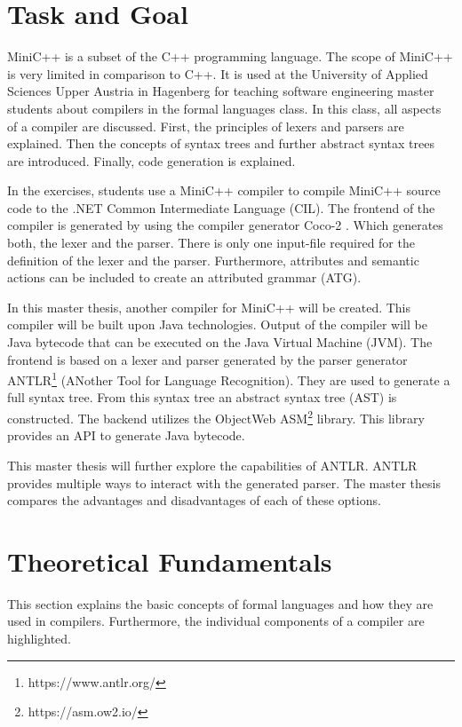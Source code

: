 \section{Task and Goal}

MiniC++ is a subset of the C++ programming language. The scope of MiniC++ is very limited in comparison to C++. It is used at the University of Applied Sciences Upper Austria in Hagenberg for teaching software engineering master students about compilers in the formal languages class. In this class, all aspects of a compiler are discussed. First, the principles of lexers and parsers are explained. Then the concepts of syntax trees and further abstract syntax trees are introduced. Finally, code generation is explained. 

In the exercises, students use a MiniC++ compiler to compile MiniC++ source code to the .NET Common Intermediate Language (CIL). The frontend of the compiler is generated by using the compiler generator Coco-2 \parencite{doblerCoco2}. Which generates both, the lexer and the parser. There is only one input-file required for the definition of the lexer and the parser. Furthermore, attributes and semantic actions can be included to create an attributed grammar (ATG). 

In this master thesis, another compiler for MiniC++ will be created. This compiler will be built upon Java technologies. Output of the compiler will be Java bytecode that can be executed on the Java Virtual Machine (JVM). The frontend is based on a lexer and parser generated by the parser generator ANTLR\footnote{https://www.antlr.org/} (ANother Tool for Language Recognition). They are used to generate a full syntax tree. From this syntax tree an abstract syntax tree (AST) is constructed. The backend utilizes the ObjectWeb ASM\footnote{https://asm.ow2.io/} library. This library provides an API to generate Java bytecode. 

This master thesis will further explore the capabilities of ANTLR. ANTLR provides multiple ways to interact with the generated parser. The master thesis compares the advantages and disadvantages of each of these options.

\section{Theoretical Fundamentals}

This section explains the basic concepts of formal languages and how they are used in compilers. Furthermore, the individual components of a compiler are highlighted. 

